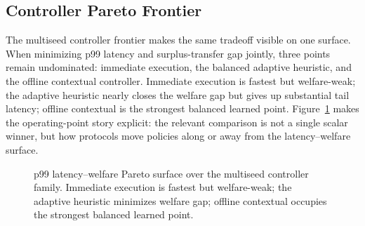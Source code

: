 \documentclass[11pt]{article}
\begin{document}
\subsection{Controller Pareto Frontier}
The multiseed controller frontier makes the same tradeoff visible on one surface. When minimizing p99 latency and surplus-transfer gap jointly, three points remain undominated: immediate execution, the balanced adaptive heuristic, and the offline contextual controller. Immediate execution is fastest but welfare-weak; the adaptive heuristic nearly closes the welfare gap but gives up substantial tail latency; offline contextual is the strongest balanced learned point. Figure~\ref{fig:paretofrontier} makes the operating-point story explicit: the relevant comparison is not a single scalar winner, but how protocols move policies along or away from the latency--welfare surface.

\begin{figure}[t]
\centering
{}
\caption{p99 latency--welfare Pareto surface over the multiseed controller family. Immediate execution is fastest but welfare-weak; the adaptive heuristic minimizes welfare gap; offline contextual occupies the strongest balanced learned point.}
\label{fig:paretofrontier}
\end{figure}
\end{document}
